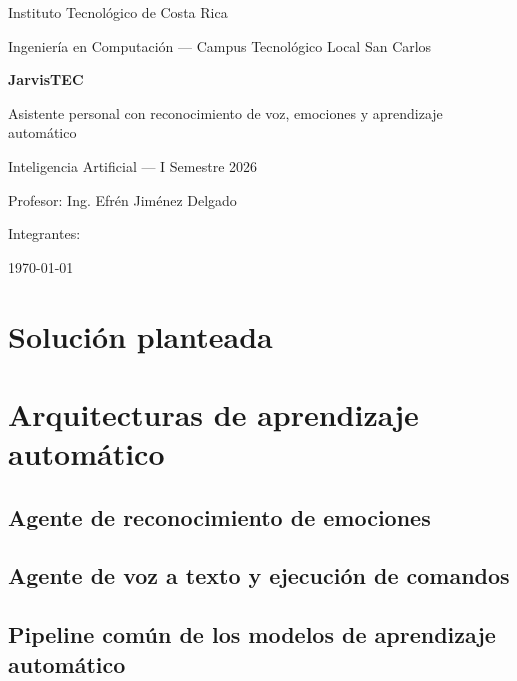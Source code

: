 \documentclass[12pt,a4paper]{article}
\begin{document}
\begin{titlepage}
  \centering
  {\Large Instituto Tecnológico de Costa Rica\par}
  {\large Ingeniería en Computación — Campus Tecnológico Local San Carlos\par}
  \vspace{2cm}
  {\Huge\bfseries JarvisTEC\par}
  {\Large Asistente personal con reconocimiento de voz, emociones y aprendizaje automático\par}
  \vspace{2cm}
  {\large Inteligencia Artificial — I Semestre 2026\par}
  {\large Profesor: Ing. Efrén Jiménez Delgado\par}
  \vspace{1cm}
  {\large Integrantes:\par}
  \vfill
  {\large \today\par}
\end{titlepage}

\tableofcontents
\newpage

\section{Solución planteada}

\section{Arquitecturas de aprendizaje automático}
\subsection{Agente de reconocimiento de emociones}
\subsection{Agente de voz a texto y ejecución de comandos}
\subsection{Pipeline común de los modelos de aprendizaje automático}
\end{document}
